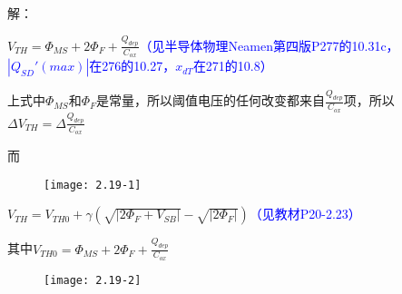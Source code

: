 






解：

$V_{TH}=\Phi_{MS}+2\Phi_F+\frac{Q_{dep}}{C_{ox}}$\textcolor{blue}{（见半导体物理Neamen第四版P277的10.31c，$|Q_{SD}'(max)|$在276的10.27，$x_{dT}$在271的10.8）}

上式中$\Phi_{MS}$和$\Phi_F$是常量，所以阈值电压的任何改变都来自$\frac{Q_{dep}}{C_{ox}}$项，所以$\Delta V_{TH}=\Delta \frac{Q_{dep}}{C_{ox}}$

而

\begin{figure}[H] %
	\begin{minipage}{\linewidth}
		\texttt{[image: 2.19-1]}
	\end{minipage}
\end{figure}



$V_{TH}=V_{TH0}+\gamma(\sqrt{|2\Phi_F+V_{SB}|}-\sqrt{|2\Phi_F|})$\textcolor{blue}{（见教材P20-2.23）}

其中$V_{TH0}=\Phi_{MS}+2\Phi_F+\frac{Q_{dep}}{C_{ox}}$


\begin{figure}[H] %
	\begin{minipage}{\linewidth}
		\texttt{[image: 2.19-2]}
	\end{minipage}
\end{figure}







